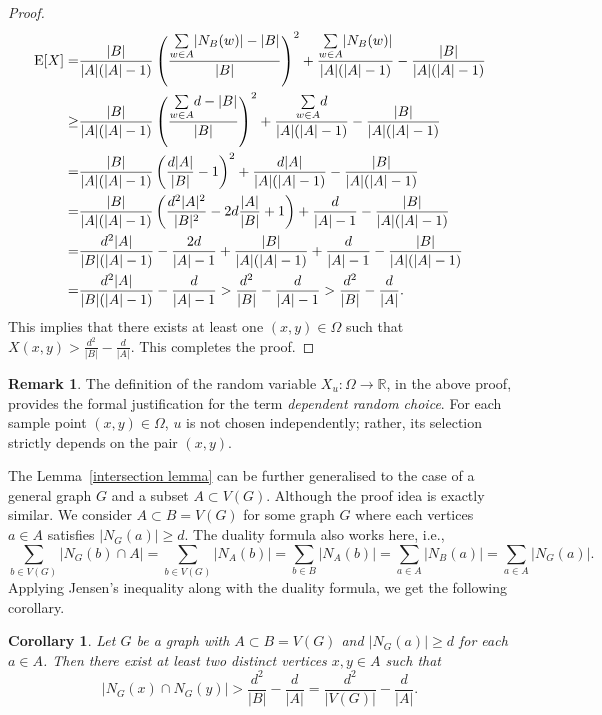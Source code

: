 \documentclass[reqno,10pt]{amsart}
\newtheorem{corollary}[theorem]{Corollary}
\theoremstyle{definition}
\newtheorem*{remark}{Remark}
\newcommand{\Ex}{\ensuremath{{\textnormal{E}}}}
\begin{document}
\begin{proof}
\begin{align*}
\Ex[X] = &\frac{|B|}{|A|(|A|-1)} \left(\frac{\underset{w\in A}{\sum}|N_{B}(w)|-|B|}{|B|}\right)^{2}+\frac{\underset{w\in A}{\sum}|N_{B}(w)|}{|A|(|A|-1)}-\frac{|B|}{|A|(|A|-1)}\\
         \geq & \frac{|B|}{|A|(|A|-1)} \left(\frac{\underset{w\in A}{\sum}d-|B|}{|B|}\right)^{2}+\frac{\underset{w\in A}{\sum}d}{|A|(|A|-1)}-\frac{|B|}{|A|(|A|-1)}\\
         =& \frac{|B|}{|A|(|A|-1)} \left(\frac{d|A|}{|B|}-1\right)^{2}+\frac{d|A|}{|A|(|A|-1)}-\frac{|B|}{|A|(|A|-1)}\\
=&\frac{|B|}{|A|(|A|-1)} \left(\frac{d^{2}|A|^{2}}{|B|^{2}}-2d\frac{|A|}{|B|}+1\right)+\frac{d}{|A|-1}-\frac{|B|}{|A|(|A|-1)}\\
=&\frac{d^{2}|A|}{|B|(|A|-1)}-\frac{2d}{|A|-1}+\frac{|B|}{|A|(|A|-1)}+\frac{d}{|A|-1}-\frac{|B|}{|A|(|A|-1)}\\
=&\frac{d^{2}|A|}{|B|(|A|-1)}-\frac{d}{|A|-1}>\frac{d^{2}}{|B|}-\frac{d}{|A|-1}>\frac{d^{2}}{|B|}-\frac{d}{|A|}.
\end{align*} 
This implies that there exists at least one $(x,y)\in \Omega$ such that $X(x,y)> \frac{d^{2}}{|B|}-\frac{d}{|A|}$. This completes the proof.
\end{proof}

\begin{remark}
The definition of the random variable $X_{u}:\Omega\rightarrow\mathbb{R}$, in the above proof, provides the formal justification for the term \emph{dependent random choice}. For each sample point $(x,y)\in\Omega$, $u$ is not chosen independently; rather, its selection strictly depends on the pair $(x,y)$.     
\end{remark}

The Lemma~\ref{intersection lemma} can be further generalised to the case of a general graph $G$ and a subset $A\subset V(G)$. Although the proof idea is exactly similar. We consider $A\subset B= V(G)$ for some graph $G$ where each vertices $a\in A$ satisfies $|N_{G}(a)|\geq d$. The duality formula also works here, i.e.,
\begin{equation*}
 \underset{b\in V(G)}{\sum}|N_{G}(b)\cap A|=\underset{b\in V(G)}{\sum}|N_{A}(b)|=\underset{b\in B}{\sum}|N_{A}(b)|=\underset{a\in A}{\sum}|N_{B}(a)|=\underset{a\in A}{\sum}|N_{G}(a)|.
\end{equation*}
Applying Jensen's inequality along with the duality formula, we get the following corollary.

\begin{corollary}\label{intersection lemma 2}
Let $G$ be a graph with $A\subset B=V(G)$ and $|N_{G}(a)|\geq d$ for each $a\in A$. Then there exist at least two distinct vertices $x,y\in A$ such that 
\begin{equation*}
 |N_{G}(x)\cap N_{G}(y)|> \frac{d^{2}}{|B|}-\frac{d}{|A|}=\frac{d^{2}}{|V(G)|}-\frac{d}{|A|}.   
\end{equation*}
\end{corollary}
\end{document}
